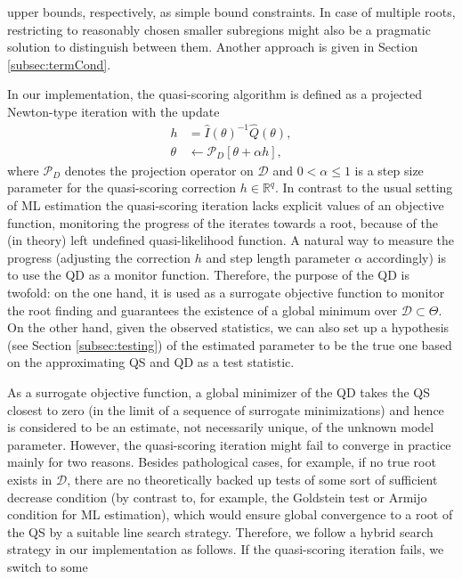 \documentclass[article, nojss]{jss}
\numberwithin{equation}{section}			%
\newcommand{\R}{\mathbb{R}}
\newcommand{\D}{\mathcal{D}}
\begin{document}
upper bounds, respectively, as simple bound constraints. In case of multiple
roots, restricting to reasonably chosen smaller subregions might also be a pragmatic
solution to distinguish between them. Another approach is given in Section
\ref{subsec:termCond}.\par
%
In our implementation, the quasi-scoring algorithm is defined as a projected
Newton-type iteration with the update
\begin{equation}
\begin{aligned}\label{qscoring}
  h & = \hat{I}(\theta)^{-1}\hat{Q}(\theta), \\
  \theta  & \leftarrow \mathcal{P}_D[\theta+\alpha h],  
\end{aligned}
\end{equation}
where $\mathcal{P}_D$ denotes the projection operator on $\D$ and $0<\alpha\leq
1$ is a step size parameter for the quasi-scoring correction $h\in\R^q$.
In contrast to the usual setting of ML estimation the quasi-scoring iteration
lacks explicit values of an objective function, monitoring the progress of the
iterates towards a root, because of the (in theory) left undefined
quasi-likelihood function. A natural way to measure the progress (adjusting the
correction $h$ and step length parameter $\alpha$ accordingly) is to use the QD as a monitor
function. Therefore, the purpose of the QD is twofold: on the one hand, it is used as
a surrogate objective function to monitor the root finding and guarantees the
existence of a global minimum over $\D\subset\Theta$. On the other hand, given
the observed statistics, we can also set up a hypothesis (see Section
\ref{subsec:testing}) of the estimated parameter to be the true one based on the
approximating QS and QD as a test statistic.\par
%
As a surrogate objective function, a global minimizer of the QD takes the QS closest
to zero (in the limit of a sequence of surrogate minimizations) and hence is
considered to be an estimate, not necessarily unique, of the unknown model parameter.
However, the quasi-scoring iteration might fail to converge in practice mainly for two reasons.
Besides pathological cases, for example, if no true root exists in $\D$, there are no
theoretically backed up tests of some sort of sufficient decrease condition (by
contrast to, for example, the Goldstein test or Armijo condition for ML estimation), which would
ensure global convergence to a root of the QS by a suitable line search
strategy. Therefore, we follow a hybrid search strategy in our implementation as
follows. If the quasi-scoring iteration fails, we switch to some
\end{document}
